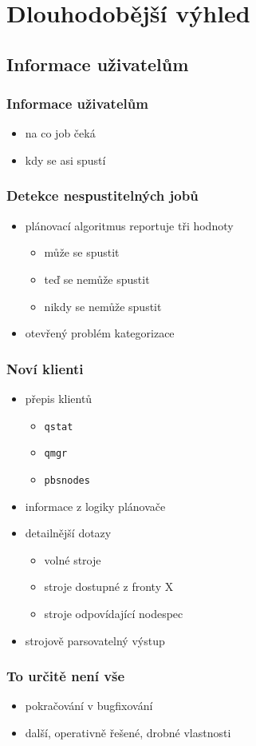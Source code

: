 \documentclass[pdftex,aspectratio=169]{beamer}
\begin{document}
\section{Dlouhodobější výhled}
\subsection{Informace uživatelům}

\begin{frame}
	\frametitle{Informace uživatelům}
	\begin{itemize}
		\item{na co job čeká}
		\item{kdy se asi spustí}
	\end{itemize}
\end{frame}

\begin{frame}
	\frametitle{Detekce nespustitelných jobů}
	\begin{itemize}
		\item{plánovací algoritmus reportuje tři hodnoty}
		\begin{itemize}
			\item{může se spustit}
			\item{teď se nemůže spustit}
			\item{nikdy se nemůže spustit}
		\end{itemize}
		\item{otevřený problém kategorizace}
	\end{itemize}
\end{frame}

\begin{frame}
	\frametitle{Noví klienti}
	\begin{itemize}
		\item{přepis klientů}
		\begin{itemize}
			\item{\texttt{qstat}}
			\item{\texttt{qmgr}}
			\item{\texttt{pbsnodes}}
		\end{itemize}
		\item{informace z logiky plánovače}
		\item{detailnější dotazy}
		\begin{itemize}
			\item{volné stroje}
			\item{stroje dostupné z fronty X}
			\item{stroje odpovídající nodespec}
		\end{itemize}
		\item{strojově parsovatelný výstup}
	\end{itemize}
\end{frame}

\begin{frame}
	\frametitle{To určitě není vše}
	\begin{itemize}
		\item{pokračování v bugfixování}
		\item{další, operativně řešené, drobné vlastnosti}
	\end{itemize}
\end{frame}
\end{document}
